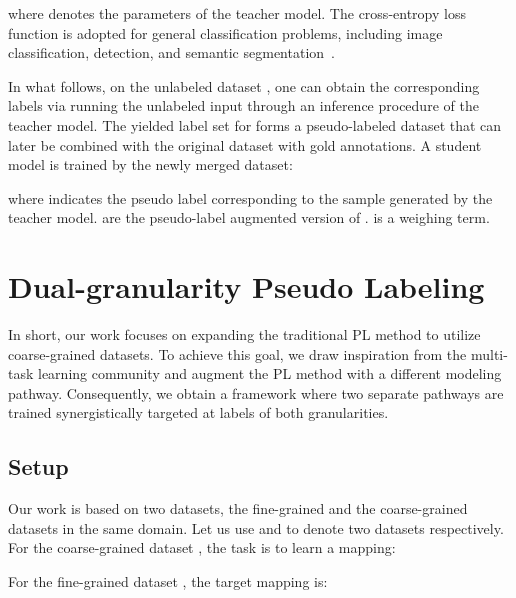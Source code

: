 \documentclass[11pt]{article}
\begin{document}
where  denotes the parameters of the teacher model.
The cross-entropy loss function is adopted for general classification problems, including image classification, detection, and semantic segmentation~\cite{ge2020mutual,pham2020meta,xie2020self,zoph2020rethinking}. 

In what follows, on the unlabeled dataset , one can obtain the corresponding labels via running the unlabeled input through an inference procedure of the teacher model. 
The yielded label set for  forms a pseudo-labeled dataset that can later be combined with the original dataset with gold annotations. 
A student model  is trained by the newly merged dataset:

where  indicates the pseudo label corresponding to the sample  generated by the teacher model.  are the pseudo-label augmented version of .  is a weighing term.








\section{Dual-granularity Pseudo Labeling}

In short, our work focuses on expanding the traditional PL method to utilize coarse-grained datasets. To achieve this goal, we draw inspiration from the multi-task learning community and augment the PL method with a different modeling pathway. Consequently, we obtain a framework where two separate pathways are trained synergistically targeted at labels of both granularities.




















\subsection{Setup}
Our work is based on two datasets, the fine-grained and the coarse-grained datasets in the same domain.
Let us use  and  to denote two datasets respectively.
For the coarse-grained dataset , the task is to learn a mapping:

For the fine-grained dataset , the target mapping is:
\end{document}
